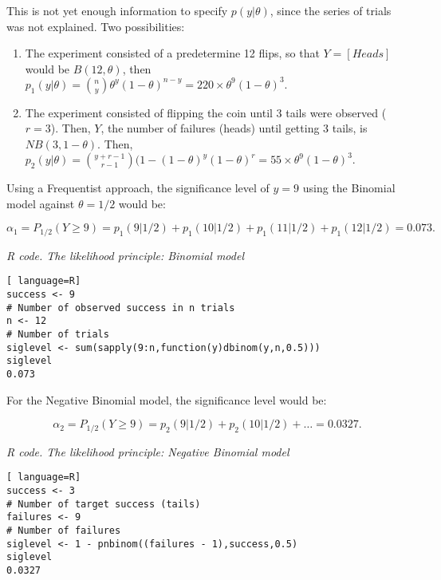 This is not yet enough information to specify $p(y|\theta)$, since the series of trials was not explained. Two possibilities:

\begin{enumerate}
	\item The experiment consisted of a predetermine 12 flips, so that $Y=\left[Heads\right]$ would be ${B}(12,\theta)$, then $p_1(y|\theta)={\binom{{n}}{{y}}}\theta^y(1-\theta)^{n-y}=220\times\theta^9(1-\theta)^{3}.$
	\item The experiment consisted of flipping the coin until 3 tails were observed ($r=3$). Then, $Y$, the number of failures (heads) until getting 3 tails, is ${N}{B}(3,1-\theta)$. Then, $p_2(y|\theta)={\binom{{y+r-1}}{{r-1}}}(1-(1-\theta)^y(1-\theta)^{r}=55\times\theta^9(1-\theta)^{3}.$  
\end{enumerate}

Using a Frequentist approach, the significance level of $y=9$ using the Binomial model against $\theta=1/2$ would be:

\begin{equation*}
	\alpha_1=P_{1/2}(Y\geq
	9)=p_1(9|1/2)+p_1(10|1/2)+p_1(11|1/2)+p_1(12|1/2)=0.073.
\end{equation*}

\begin{tcolorbox}[enhanced,width=4.67in,center upper,
	fontupper=\large\bfseries,drop shadow southwest,sharp corners]
	\textit{R code. The likelihood principle: Binomial model}
\begin{VF}
\begin{lstlisting}[ language=R]
success <- 9 
# Number of observed success in n trials
n <- 12 
# Number of trials
siglevel <- sum(sapply(9:n,function(y)dbinom(y,n,0.5)))
siglevel
0.073
\end{lstlisting}
\end{VF}
\end{tcolorbox}

For the Negative Binomial model, the significance level would be:

\begin{equation*}
	\alpha_2=P_{1/2}(Y\geq 9)=p_2(9|1/2)+p_2(10|1/2)+\ldots=0.0327.
\end{equation*}

\begin{tcolorbox}[enhanced,width=4.67in,center upper,
	fontupper=\large\bfseries,drop shadow southwest,sharp corners]
	\textit{R code. The likelihood principle: Negative Binomial model}
\begin{VF}
\begin{lstlisting}[ language=R]
success <- 3 
# Number of target success (tails)
failures <- 9 
# Number of failures
siglevel <- 1 - pnbinom((failures - 1),success,0.5)
siglevel
0.0327
\end{lstlisting}
\end{VF}
\end{tcolorbox}

